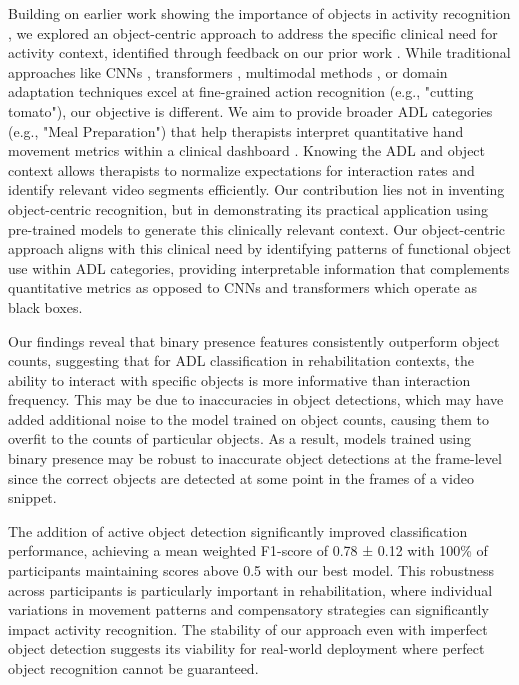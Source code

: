 \documentclass[journal,twoside,web]{ieeecolor}
\begin{document}
Building on earlier work showing the importance of objects in activity recognition \cite{Surie2007-rr, Wu2007-jc, Palmes2010-lg, Escorcia2022-sj}, we explored an object-centric approach to address the specific clinical need for activity context, identified through feedback on our prior work \cite{Kadambi2024-fy}. While traditional approaches like CNNs \cite{Douache2023-ez}, transformers \cite{Li2020-zg, Bertasius2021-re, Liu2021-tq, Pan2023-zq}, multimodal methods \cite{Papadakis2024-ja, Hao2024-ta}, or domain adaptation techniques \cite{Liu2023-sa} excel at fine-grained action recognition (e.g., "cutting tomato"), our objective is different. We aim to provide broader ADL categories (e.g., "Meal Preparation") that help therapists interpret quantitative hand movement metrics within a clinical dashboard \cite{Kadambi2023-iv}. Knowing the ADL and object context allows therapists to normalize expectations for interaction rates and identify relevant video segments efficiently. Our contribution lies not in inventing object-centric recognition, but in demonstrating its practical application using pre-trained models to generate this clinically relevant context. Our object-centric approach aligns with this clinical need by identifying patterns of functional object use within ADL categories, providing interpretable information that complements quantitative metrics as opposed to CNNs and transformers which operate as black boxes.

Our findings reveal that binary presence features consistently outperform object counts, suggesting that for ADL classification in rehabilitation contexts, the ability to interact with specific objects is more informative than interaction frequency. This may be due to inaccuracies in object detections, which may have added additional noise to the model trained on object counts, causing them to overfit to the counts of particular objects. As a result, models trained using binary presence may be robust to inaccurate object detections at the frame-level since the correct objects are detected at some point in the frames of a video snippet.

The addition of active object detection significantly improved classification performance, achieving a mean weighted F1-score of 0.78 ± 0.12 with 100\% of participants maintaining scores above 0.5 with our best model. This robustness across participants is particularly important in rehabilitation, where individual variations in movement patterns and compensatory strategies can significantly impact activity recognition. The stability of our approach even with imperfect object detection suggests its viability for real-world deployment where perfect object recognition cannot be guaranteed.
\end{document}
